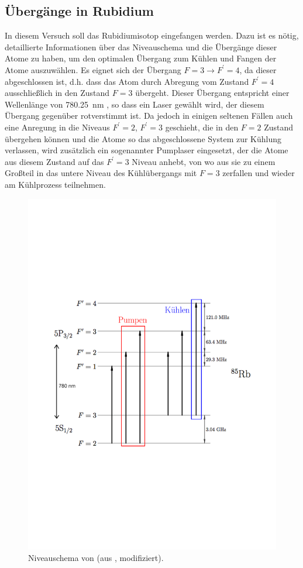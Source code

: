 \documentclass[11pt, a4paper]{article}
\numberwithin{equation}{section}
\begin{document}
\subsection{Übergänge in Rubidium}
\label{sec:rb_uebergaenge}

In diesem Versuch soll das Rubidiumisotop  eingefangen werden.
Dazu ist es nötig, detaillierte Informationen über das Niveauschema und die Übergänge dieser Atome zu haben, um den optimalen Übergang zum Kühlen und Fangen der Atome auszuwählen.
Es eignet sich der Übergang $F=3 \rightarrow F^\prime=4$, da dieser abgeschlossen ist, d.h. dass das Atom durch Abregung vom Zustand $F^\prime=4$ ausschließlich in den Zustand $F=3$ übergeht.
Dieser Übergang entspricht einer Wellenlänge von \SI{780.25}{nm} \cite{steck}, so dass ein Laser gewählt wird, der diesem Übergang gegenüber rotverstimmt ist.
Da jedoch in einigen seltenen Fällen auch eine Anregung in die Niveaus $F^\prime=2$, $F^\prime=3$ geschieht, die in den $F=2$ Zustand übergehen können und die Atome so das abgeschlossene System zur Kühlung verlassen, wird zusätzlich ein sogenannter Pumplaser eingesetzt, der die Atome aus diesem Zustand auf das $F^\prime=3$ Niveau anhebt, von wo aus sie zu einem Großteil in das untere Niveau des Kühlübergangs mit $F=3$ zerfallen und wieder am Kühlprozess teilnehmen.
\begin{figure}[htb]
	\centering
	\includegraphics[width=.65\textwidth]{./figures/theory/levelscheme}
	\caption{Niveauschema von  (aus \cite{script}, modifiziert).}
\end{figure}
\end{document}
